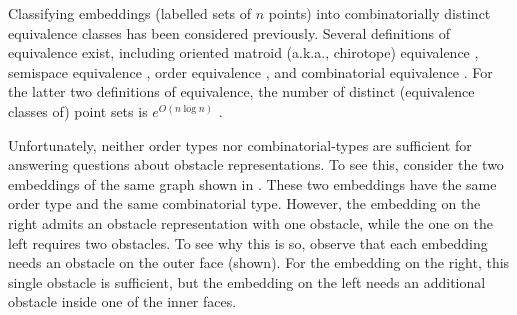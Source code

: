 \documentclass{patmorin}
\begin{document}
Classifying embeddings (labelled sets of $n$ points) into combinatorially
distinct equivalence classes has been considered previously. Several
definitions of equivalence exist, including oriented matroid (a.k.a.,
chirotope) equivalence
\cite{bland.vergnas:orientability,folkman.lawrence:oriented},
semispace equivalence \cite{goodman.pollack:semispaces}, order equivalence
\cite{goodman.pollack:multidimensional}, and combinatorial equivalence
\cite{goodman:on,goodman.pollack:semispaces}.  For the latter two
definitions of equivalence, the number of distinct (equivalence classes
of) point sets is $e^{O(n\log n)}$ \cite{goodman.pollack:upper}.


Unfortunately, neither order types nor combinatorial-types are
sufficient for answering questions about obstacle representations.
To see this, consider the two embeddings of the same graph shown in
.  These two embeddings have the same order
type and the same combinatorial type. However, the embedding on the right
admits an obstacle representation with one obstacle, while the one on
the left requires two obstacles. To see why this is so, observe that each
embedding needs an obstacle on the outer face (shown). For the embedding
on the right, this single obstacle is sufficient, but the embedding
on the left needs an additional obstacle inside one of the inner faces.
\end{document}
